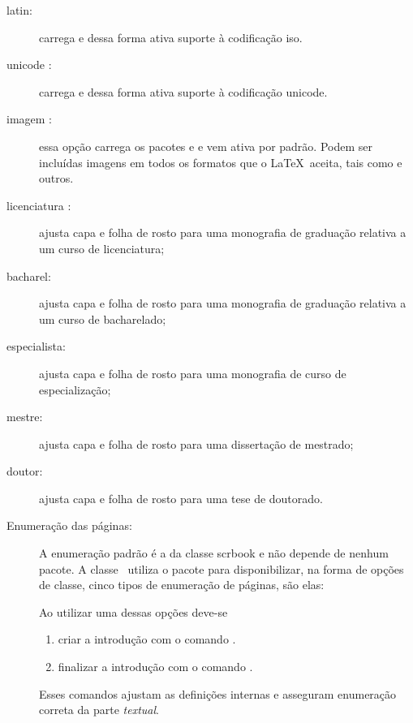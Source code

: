 \begin{description}
\item[latin:] carrega  e dessa forma ativa suporte à
   codificação iso.
\item[unicode :] carrega  e dessa forma
   ativa suporte à codificação unicode.
\item[imagem :] essa opção carrega os pacotes  e
    e vem ativa por padrão. Podem ser incluídas imagens
   em todos os formatos que o \LaTeX\ aceita, tais como
    e outros.
\item[licenciatura :] ajusta {\sffamily capa} e {\sffamily folha
   de rosto} para uma monografia de graduação relativa a um curso de  licenciatura;
\item[bacharel:] ajusta {\sffamily capa} e {\sffamily folha de rosto}
   para uma monografia de graduação relativa a um curso de bacharelado;
\item[especialista:] ajusta {\sffamily capa} e {\sffamily folha de rosto}
   para uma monografia de curso de especialização;
\item[mestre:] ajusta {\sffamily capa} e {\sffamily folha de rosto} para
   uma dissertação de mestrado;
\item[doutor:] ajusta {\sffamily capa} e {\sffamily folha de rosto} para
   uma tese de doutorado.

\item[Enumeração das páginas:] A enumeração padrão é a da classe
    \textrm{scrbook} e não depende de nenhum pacote. A classe \estilo\
    utiliza o pacote  para disponibilizar, na
    forma de opções de classe, cinco tipos de enumeração de páginas, são elas:
    \begin{center}
    \end{center}
     Ao utilizar uma dessas opções deve-se
    \begin{enumerate}
    	\item criar a introdução com o comando .
    	\item finalizar a introdução com o comando .
    \end{enumerate}
    Esses comandos ajustam as definições internas e asseguram enumeração correta da parte \emph{textual}.


\end{description}
